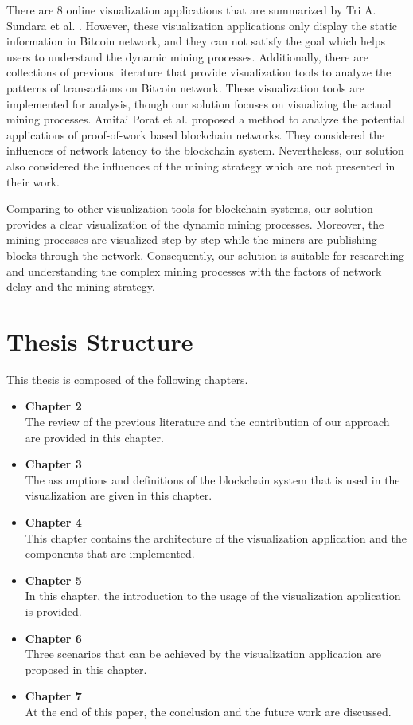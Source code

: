 There are 8 online visualization applications that are summarized by Tri A. Sundara et al. \cite{Sundara2017}. However, these visualization applications only display the static information in Bitcoin network, and they can not satisfy the goal which helps users to understand the dynamic mining processes. Additionally, there are collections of previous literature that provide visualization tools \cite{Battista2015, Kuzuno2017, McGinn2016, Saublet2015, Fleder2015, Baumann2014} to analyze the patterns of transactions on Bitcoin network. These visualization tools are implemented for analysis, though our solution focuses on visualizing the actual mining processes. Amitai Porat et al. \cite{Porat} proposed a method to analyze the potential applications of proof-of-work based blockchain networks. They considered the influences of network latency to the blockchain system. Nevertheless, our solution also considered the influences of the mining strategy which are not presented in their work.

Comparing to other visualization tools for blockchain systems, our solution provides a clear visualization of the dynamic mining processes. Moreover, the mining processes are visualized step by step while the miners are publishing blocks through the network. Consequently, our solution is suitable for researching and understanding the complex mining processes with the factors of network delay and the mining strategy.

\section{Thesis Structure}

This thesis is composed of the following chapters.

\begin{itemize}
    \item \textbf{Chapter 2} \\
        The review of the previous literature and the contribution of our approach are provided in this chapter.
    \item \textbf{Chapter 3} \\
        The assumptions and definitions of the blockchain system that is used in the visualization are given in this chapter.
    \item \textbf{Chapter 4} \\
        This chapter contains the architecture of the visualization application and the components that are implemented.
    \item \textbf{Chapter 5} \\
        In this chapter, the introduction to the usage of the visualization application is provided.
    \item \textbf{Chapter 6} \\
        Three scenarios that can be achieved by the visualization application are proposed in this chapter.
    \item \textbf{Chapter 7} \\
        At the end of this paper, the conclusion and the future work are discussed.
\end{itemize}
